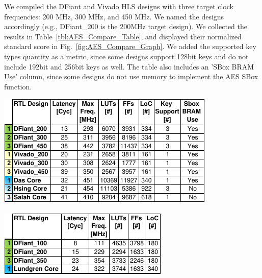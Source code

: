 
We compiled the DFiant and Vivado HLS designs with three target clock frequencies: 200 MHz, 300 MHz, and 450 MHz. We named the designs accordingly (e.g., DFiant\_200 is the 200MHz target design). We collected the results in Table~\ref{tbl:AES_Compare_Table}, and displayed their normalized standard score in Fig.~\ref{fig:AES_Compare_Graph}. We added the supported key types quantity as a metric, since some designs support 128bit keys and do not include 192bit and 256bit keys as well. The table also includes an 'SBox BRAM Use' column, since some designs do not use memory to implement the AES SBox function.

\begin{table}[t!]
  \centering
  \begin{minipage}[t][5cm][t]{0.64\linewidth}
    \centering
    \label{tbl:AES_Compare_Table}
    \includegraphics[scale=1]{graphics/AES_Compare_Table.pdf} 
  \end{minipage}
  \hfill
  \begin{minipage}[t][5cm][t]{0.35\linewidth}
    \centering
    \label{tbl:FP_Compare_Table}
    \includegraphics[scale=1]{graphics/FP_Compare_Table.pdf} 
  \end{minipage}

\end{table}
